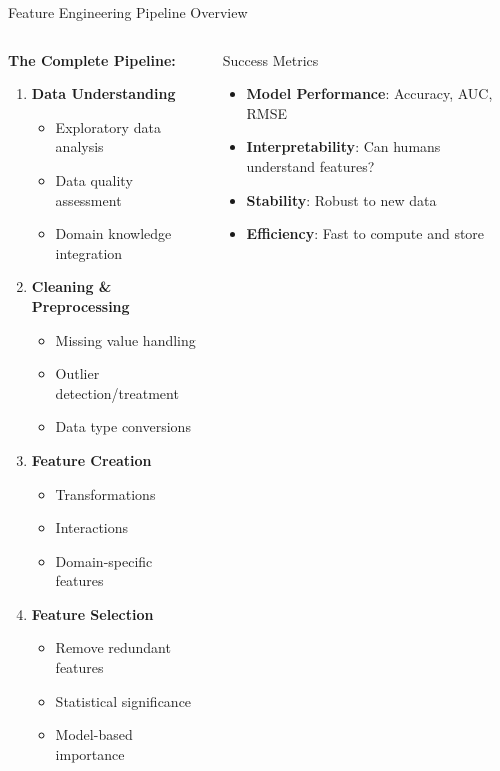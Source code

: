 \documentclass[aspectratio=169,11pt]{beamer}
\begin{document}
\begin{frame}{Feature Engineering Pipeline Overview}
\begin{columns}
\begin{column}{0.5\textwidth}
\textbf{The Complete Pipeline:}

\begin{enumerate}
\item \textbf{Data Understanding}
   \begin{itemize}
   \item Exploratory data analysis
   \item Data quality assessment
   \item Domain knowledge integration
   \end{itemize}

\item \textbf{Cleaning \& Preprocessing}
   \begin{itemize}
   \item Missing value handling
   \item Outlier detection/treatment
   \item Data type conversions
   \end{itemize}

\item \textbf{Feature Creation}
   \begin{itemize}
   \item Transformations
   \item Interactions
   \item Domain-specific features
   \end{itemize}

\item \textbf{Feature Selection}
   \begin{itemize}
   \item Remove redundant features
   \item Statistical significance
   \item Model-based importance
   \end{itemize}
\end{enumerate}
\end{column}
\begin{column}{0.5\textwidth}
\begin{block}{Success Metrics}
\begin{itemize}
\item \textbf{Model Performance}: Accuracy, AUC, RMSE
\item \textbf{Interpretability}: Can humans understand features?
\item \textbf{Stability}: Robust to new data
\item \textbf{Efficiency}: Fast to compute and store
\end{itemize}
\end{block}


\end{column}
\end{columns}
\end{frame}
\end{document}
